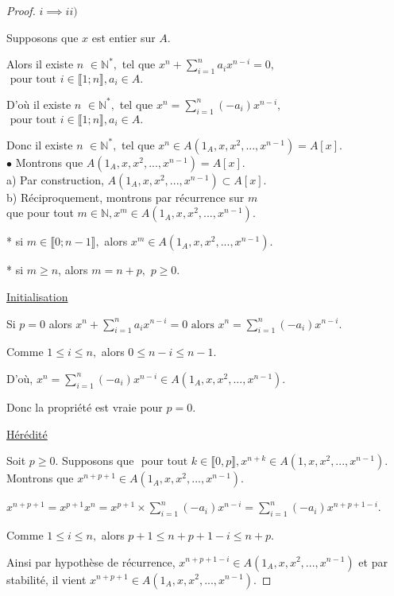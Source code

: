 \begin{proof}
	$i \implies ii)$
	
	Supposons que $x$ est entier sur $A.$
	
	Alors il existe $n$ $\in \mathbb{N}^{\ast },$ tel que $x^{n}+\sum\limits_{i=1}^{n}a_{i}x^{n-i}=0,$ $\text{ pour tout } i\in \llbracket 1; n \rrbracket ,a_{i}\in A.$
	
	D'où il existe $n$ $\in \mathbb{N}^{\ast },$ tel que $x^{n}=\sum\limits_{i=1}^{n}(-a_{i})x^{n-i},$ $\text{ pour tout } i\in \llbracket 1; n \rrbracket ,a_{i}\in A.$
	
	Donc il existe $n$ $\in \mathbb{N}^{\ast },$ tel que $x^{n}\in A(1_A,x,x^{2},...,x^{n-1})=A[x].$\\
	$\bullet$ Montrons que $A(1_A,x,x^{2},...,x^{n-1})=A[x].$\\
	a) Par construction, $A(1_A,x,x^{2},...,x^{n-1})\subset A[x].$\\
	b) Réciproquement, montrons par récurrence sur $m$\\ que pour tout $m	\in \mathbb{N},x^{m}\in A(1_A,x,x^{2},...,x^{n-1}).$
	
	* si $m\in \llbracket 0; n-1 \rrbracket ,$ alors $x^{m}\in A(1_A,x,x^{2},...,x^{n-1}).$
	
	* si $m\geq n$, alors $m=n+p,$ $p\geq 0.$
	
	\underline{Initialisation}
	
	Si $p=0$ alors  $x^{n}+\sum\limits_{i=1}^{n}a_{i}x^{n-i}=0\text{ alors }
	x^{n}=\sum\limits_{i=1}^{n}(-a_{i})x^{n-i}.$
	
	Comme $1\leq i\leq n,$ alors $0\leq n-i\leq n-1$.
	
	D'où, $x^{n}=\sum\limits_{i=1}^{n}(-a_{i})x^{n-i}\in
	A(1_A,x,x^{2},...,x^{n-1}).$
	
	Donc la propriété est vraie pour $p=0$.
	
	\underline{Hérédité}
	
	Soit $p\geq 0.$ Supposons que $\text{ pour tout } k\in \llbracket 0, p \rrbracket
	,x^{n+k}\in A(1,x,x^{2},...,x^{n-1})$.\\ Montrons que $x^{n+p+1}\in
	A(1_A,x,x^{2},...,x^{n-1}).$
	
	$x^{n+p+1}=x^{p+1}x^{n}=x^{p+1}\times
	\sum\limits_{i=1}^{n}(-a_{i})x^{n-i}=\sum\limits_{i=1}^{n}(-a_{i})x^{n+p+1-i}$.
	
	Comme $1\leq i\leq n,$ alors $p+1\leq n+p+1-i\leq n+p$.
	
	Ainsi par hypothèse de récurrence, $x^{n+p+1-i}\in
	A(1_A,x,x^{2},...,x^{n-1})$ et par stabilité, il vient $x^{n+p+1}\in
	A(1_A,x,x^{2},...,x^{n-1}).$
	

\end{proof}
